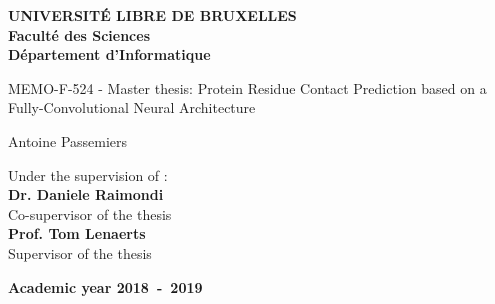 \documentclass[11pt,a4paper,oneside]{book}
\begin{document}
\frontmatter
\begin{titlepage}
\begin{center}
\textbf{UNIVERSIT\'E LIBRE DE BRUXELLES}\\
\textbf{Facult\'{e} des Sciences}\\
\textbf{D\'{e}partement d'Informatique}
\vfill{}\vfill{}

{\LARGE  MEMO-F-524 - Master thesis:
 \vspace*{2cm}
 \linebreak[4] Protein Residue Contact Prediction based on a \\
 \vspace*{0.4cm} Fully-Convolutional Neural Architecture}

\vspace{0.5cm}

{\Huge \par}
\begin{center}{\Large Antoine Passemiers}\end{center}{\Huge \par}
\vfill{}\vfill{}
\large Under the supervision of : \\
\vspace*{1cm}
\vspace{0.2cm}
\textbf{Dr. Daniele Raimondi} \\
\large Co-supervisor of the thesis \\
\vspace{0.5cm}
\textbf{Prof. Tom Lenaerts} \\
\large Supervisor of the thesis \\
{\large }\hfill{}{}
{\large\par}\vfill{}\vfill{}\enlargethispage{3cm}
\textbf{Academic year 2018~-~2019}
\end{center}
\end{titlepage}


\thispagestyle{empty} 
\null

\makeatletter
\def\BState{\State\hskip-\ALG@thistlm}
\makeatother

\newenvironment{vcenterpage}
{\newpage\thispagestyle{empty} 
\vspace*{\fill}}
{\vspace*{\fill}\par\pagebreak}
\end{document}
